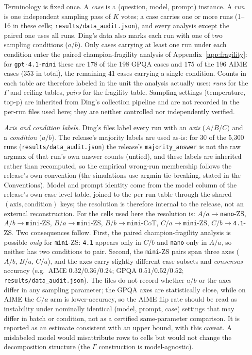 \documentclass{article}
\newcommand{\agreementIndex}{\Gamma}
\begin{document}
Terminology is fixed once. A \emph{case} is a (question, model, prompt)
instance. A \emph{run} is one independent sampling pass of $K$ votes; a case
carries one or more runs (1--16 in these cells; \texttt{results/data\_audit.json}), and every analysis
except the paired one uses all runs. Ding's data also marks each
run with one of two sampling conditions ($a$/$b$). Only cases carrying at
least one run under each condition enter the paired
champion-fragility analysis of Appendix~\ref{app:fragility}: for
\texttt{gpt-4.1-mini} these are 178 of the 198 GPQA cases and 175 of the
196 AIME cases (353 in total), the remaining 41 cases carrying a single
condition. Counts in each table are therefore labeled in the unit the
analysis actually uses: \emph{runs} for the $\agreementIndex$ and ceiling tables,
\emph{pairs} for the fragility table. Sampling settings (temperature,
top-p) are inherited from Ding's collection pipeline and are
not recorded in the per-run files used here; they are neither controlled nor independently verified.

\emph{Axis and condition labels.}
Ding's files label every run with an \emph{axis} ($A$/$B$/$C$) and a
\emph{condition} ($a$/$b$). The release's majority labels are used as-is:
for 30 of the 5,300 runs (\texttt{results/data\_audit.json}) the release's \texttt{majority\_answer} is not
the raw argmax of that run's own answer counts (untied), and these labels are inherited rather than recomputed, so the empirical wrong-run
membership follows the release's own convention (the simulations use
argmin tie-breaking, stated in the Conventions). Model and prompt identity come from the
model column of the release's own case-level table, joined to the
per-run table through the shared $(\text{axis},\text{condition})$ keys;
the resolution is therefore internal to the release, not an external
reconstruction. For the cells used here the resolution is:
$A/a\!\to\!$\texttt{nano}-ZS, $A/b\!\to\!$\texttt{mini}-ZS,
$B/a\!\to\!$\texttt{mini}-ZS, $B/b\!\to\!$\texttt{mini}-CoT,
$C/a\!\to\!$\texttt{mini}-ZS, $C/b\!\to\!$\texttt{4.1}-ZS. Two
consequences follow. First, the paired champion-fragility analysis is
possible \emph{only} for \texttt{mini}-ZS: \texttt{4.1} appears only in
$C/b$ and \texttt{nano} only in $A/a$, so neither has two conditions to
pair. Second, the \texttt{mini}-ZS pairs span three axes ($A/b$, $B/a$,
$C/a$), and the axes carry slightly different case subsets and
\emph{consensus} accuracy
(e.g.\ AIME $0.32$/$0.36$/$0.24$; GPQA $0.51$/$0.52$/$0.52$; \texttt{results/data\_audit.json}).
The files do not record whether $a$/$b$ or the axes differ in any
sampling parameter; the GPQA axes are statistically close, while on AIME
the $C/a$ arm is lower-accuracy, so the AIME flip rate should be read as
instability under nominally identical (model, prompt, case) settings
that may differ in batch or condition, not as a certified same-parameter
comparison. It is reported as an estimate consistent with an upper bound, with this caveat. A mislabeled model would misattribute rows to cells but would
not change the decomposition structure (the $\agreementIndex$ construction is
model-agnostic).
\end{document}
